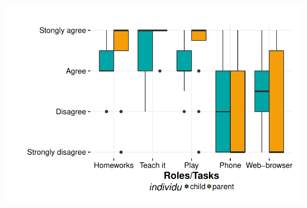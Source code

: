 \documentclass{article}
\begin{document}
\includegraphics{interviews-plot_functionality_parent_enfant}
\end{document}
